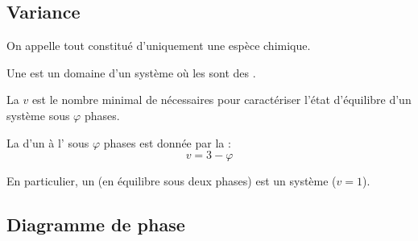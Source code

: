 \subsection{Variance}

\begin{definition}
On appelle  tout  constitué d'uniquement une espèce chimique.
\end{definition}

\begin{definition}
Une  est un domaine d'un système où les  sont des .
\end{definition}

\begin{definition}
La  $v$ est le nombre minimal de  nécessaires pour caractériser l'état d'équilibre d'un système sous $\varphi$ phases.
\end{definition}

\begin{propriete}[admis]
La  d'un  à l' sous $\varphi$ phases est donnée par la  :
\[v = 3 - \varphi\]
\end{propriete}

\begin{remarque}
En particulier, un  (en équilibre sous deux phases) est un système  ($v = 1$).
\end{remarque}



\subsection{Diagramme de phase}


